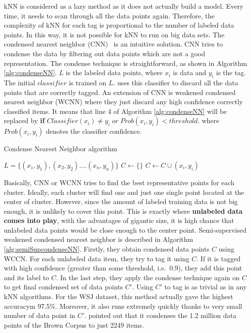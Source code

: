 kNN is considered as a lazy method as it does not actually build a model. Every time, it needs to scan through all the data points again. Therefore, the complexity of kNN for each tag is proportional to the number of labeled data points. In this way, it is not possible for kNN to run on big data sets. The condensed nearest neighbor (CNN)~\cite{semiSuPOSCondense} is an intuitive solution. CNN tries to condense the data by filtering out data points which are not a good representation. The condense technique is straightforward, as shown in Algorithm \ref{alg:condenseNN}. $L$ is the labeled data points, where $x_i$ is data and $y_i$ is the tag. The initial $classifier$ is trained on $L$.  uses this classifier to discard all the data points that are correctly tagged. An extension of CNN is weakened condensed nearest neighbor (WCNN) where they just discard any high confidence correctly classified items. It means that line 4 of Algorithm \ref{alg:condenseNN} will be replaced by \textbf{if} $Classifier(x_i) \neq y_i \; or \; Prob(x_i,y_i) < threshold$. where $Prob(x_i,y_i)$ denotes the classifier confidence. 
\begin{algorithm}
\caption{Condense Nearest Neighbor algorithm}
\label{alg:condenseNN}
\begin{algorithmic} [1]
\STATE $L = \{(x_1,y_1),(x_2,y_2) .... (x_n,y_n)\} $ 
\STATE $C \leftarrow \{\}$
	\STATE $C \leftarrow C \cup (x_i,y_i)$		
	\ENDIF
\ENDFOR
\end{algorithmic}
\end{algorithm}
Basically, CNN or WCNN tries to find the best representative points for each cluster. Ideally, each cluster will find one and just one single point located at the center of cluster. However, since the amount of labeled training data is not big enough, it is unlikely to cover this point. This is exactly where \textbf{unlabeled data comes into play}, with the advantages of gigantic size, it is high chance that unlabeled data points would be close enough to the center point. Semi-supervised weakened condensed nearest neighbor is described in Algorithm \ref{alg:semiSupcondenseNN}. Firstly, they obtain condensed data points $C$ using WCCN. For each unlabeled data item, they try to tag it using $C$. If it is tagged with high confidence (greater than some threshold, i.e.\ 0.9), they add this point and its label to $C$. In the last step, they apply the condense technique again on $C$ to get final condensed set of data points $C'$. Using $C'$ to tag is as trivial as in any kNN algorithms. For the WSJ dataset, this method actually gave the highest accuracym 97.5\%. Moreover, it also runs extremely quickly thanks to very small number of data point in $C'$.  pointed out that it condenses the 1.2 million data points of the Brown Corpus to just 2249 items. 
